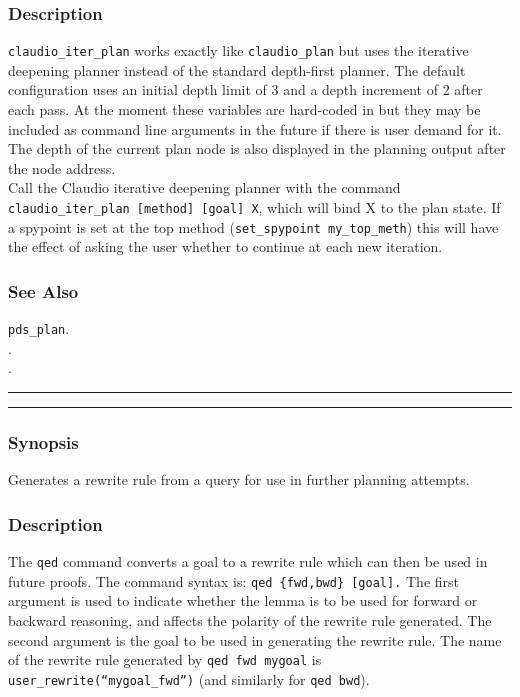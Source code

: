 \subsubsection*{Description}
{\tt claudio\_iter\_plan} works exactly like {\tt claudio\_plan} but uses the
iterative deepening planner instead of the standard depth-first
planner.  The default configuration uses an initial depth limit of 3
and a depth increment of 2 after each pass.  At the moment these
variables are hard-coded in but they may be included as command line
arguments in the future if there is user demand for it.  The depth of
the current plan node is also displayed in the planning output after the 
node address. \\

\noindent Call the Claudio iterative deepening planner with the command
\texttt{claudio\_iter\_plan [method] [goal] X}, which will bind X to
the plan state.  If a spypoint is set at the top method
(\texttt{set\_spypoint my\_top\_meth}) this will have the effect of
asking the user whether to continue at each new iteration.

\subsubsection*{See Also}
{\tt pds\_plan}. \\
. \\
. \\

\vspace{2mm}
\hrule
\vspace{2mm}
\begin{Large}
\end{Large}
\vspace{2mm}
\hrule
\vspace{2mm}


\subsubsection*{Synopsis}
Generates a rewrite rule from a query for use in further planning attempts.

\subsubsection*{Description}
The {\tt qed} command converts a goal to a rewrite rule which can then
be used in future proofs.  The command syntax is: {\tt qed \{fwd,bwd\}
  [goal].}  The first argument is used to indicate whether the lemma
is to be used for forward or backward reasoning, and affects the
polarity of the rewrite rule generated.  The second argument is the
goal to be used in generating the rewrite rule.  The name of the
rewrite rule generated by {\tt qed fwd mygoal} is {\tt
  user\_rewrite(``mygoal\_fwd'')} (and similarly for {\tt qed bwd}).

